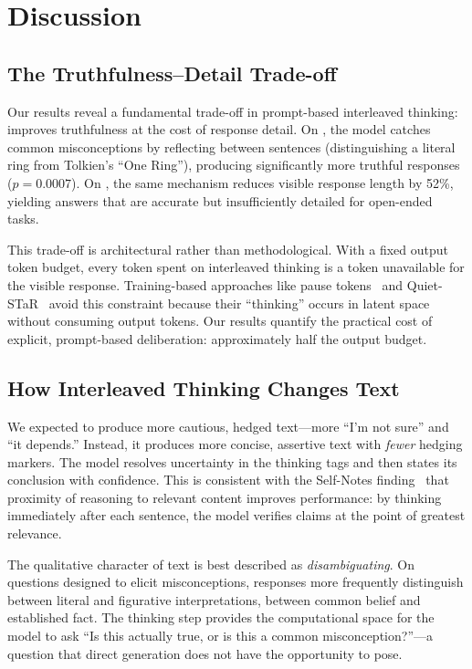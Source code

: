 \section{Discussion}
\label{sec:discussion}

\subsection{The Truthfulness--Detail Trade-off}

Our results reveal a fundamental trade-off in prompt-based interleaved thinking: \sentthink improves truthfulness at the cost of response detail. On \tqa, the model catches common misconceptions by reflecting between sentences (\eg distinguishing a literal ring from Tolkien's ``One Ring''), producing significantly more truthful responses ($p{=}0.0007$). On \mtbench, the same mechanism reduces visible response length by 52\%, yielding answers that are accurate but insufficiently detailed for open-ended tasks.

This trade-off is architectural rather than methodological. With a fixed output token budget, every token spent on interleaved thinking is a token unavailable for the visible response. Training-based approaches like pause tokens~\cite{goyal2023think} and Quiet-STaR~\cite{zelikman2024quietstar} avoid this constraint because their ``thinking'' occurs in latent space without consuming output tokens. Our results quantify the practical cost of explicit, prompt-based deliberation: approximately half the output budget.

\subsection{How Interleaved Thinking Changes Text}

We expected \sentthink to produce more cautious, hedged text---more ``I'm not sure'' and ``it depends.'' Instead, it produces more concise, assertive text with \emph{fewer} hedging markers. The model resolves uncertainty in the thinking tags and then states its conclusion with confidence. This is consistent with the Self-Notes finding~\cite{lanchantin2023selfnotes} that proximity of reasoning to relevant content improves performance: by thinking immediately after each sentence, the model verifies claims at the point of greatest relevance.

The qualitative character of \sentthink text is best described as \emph{disambiguating}. On \tqa questions designed to elicit misconceptions, \sentthink responses more frequently distinguish between literal and figurative interpretations, between common belief and established fact. The thinking step provides the computational space for the model to ask ``Is this actually true, or is this a common misconception?''---a question that direct generation does not have the opportunity to pose.

